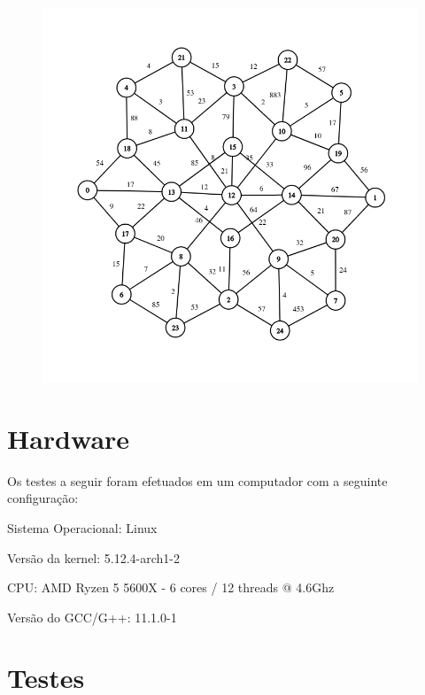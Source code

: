 \documentclass[12pt]{article}
\begin{document}
\begin{figure}[ht]
    \centering
    \includegraphics[scale=0.6]{grafo4.png}
\end{figure}

\newpage

\section*{Hardware}
Os testes a seguir foram efetuados em um computador com a seguinte configuração:


Sistema Operacional: Linux


Versão da kernel: 5.12.4-arch1-2


CPU: AMD Ryzen 5 5600X - 6 cores / 12 threads @ 4.6Ghz


Versão do GCC/G++: 11.1.0-1


\section*{Testes}
\end{document}
